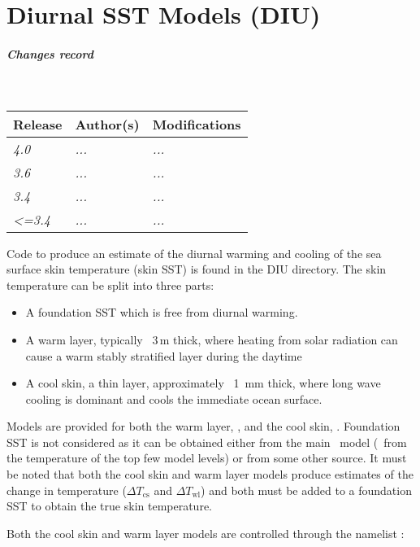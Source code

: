 \documentclass[../main/NEMO_manual]{subfiles}
\begin{document}
\chapter{Diurnal SST Models (DIU)}
\label{chap:DIU}

\chaptertoc

\paragraph{Changes record} ~\\

{\footnotesize
  \begin{tabularx}{\textwidth}{l||X|X}
    Release & Author(s) & Modifications \\
    \hline
    {\em   4.0} & {\em ...} & {\em ...} \\
    {\em   3.6} & {\em ...} & {\em ...} \\
    {\em   3.4} & {\em ...} & {\em ...} \\
    {\em <=3.4} & {\em ...} & {\em ...}
  \end{tabularx}
}

\clearpage

Code to produce an estimate of the diurnal warming and cooling of the sea surface skin
temperature (skin SST) is found in the DIU directory.
The skin temperature can be split into three parts:
\begin{itemize}
\item A foundation SST which is free from diurnal warming.
\item A warm layer, typically ~3\,m thick,
  where heating from solar radiation can cause a warm stably stratified layer during the daytime
\item A cool skin, a thin layer, approximately ~1\, mm thick,
  where long wave cooling is dominant and cools the immediate ocean surface.
\end{itemize}

Models are provided for both the warm layer, , and the cool skin, .
Foundation SST is not considered as it can be obtained either from the main \NEMO\ model
(\ie\ from the temperature of the top few model levels) or from some other source.
It must be noted that both the cool skin and warm layer models produce estimates of the change in temperature
($\Delta T_{\mathrm{cs}}$ and $\Delta T_{\mathrm{wl}}$) and
both must be added to a foundation SST to obtain the true skin temperature.

Both the cool skin and warm layer models are controlled through the namelist :
\end{document}
